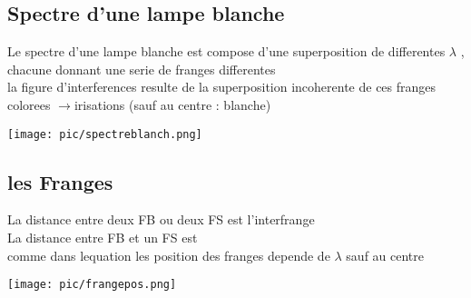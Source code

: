 \documentclass[12pt]{book}
\begin{document}
            \subsection{Spectre d'une lampe blanche}
                \begin{minipage}{0.49\linewidth}
                    Le spectre d'une lampe blanche est compose d'une superposition de differentes $\lambda$ , chacune donnant une serie de franges differentes \\
                    la figure d'interferences resulte de la superposition incoherente de ces franges colorees $\to $irisations (sauf au centre : blanche)
                \end{minipage}
                \begin{minipage}{0.49\linewidth}
                    \texttt{[image: pic/spectreblanch.png]}
                \end{minipage}
            \subsection{les Franges}
                \begin{minipage}{0.8\linewidth}
                    La distance entre deux FB ou deux FS est l'interfrange  \\
                    La distance entre FB et un FS est  \\
                    comme dans lequation les position des franges depende de $\lambda $ sauf au centre 
                \end{minipage}
                \begin{minipage}{0.2\linewidth}
                    \texttt{[image: pic/frangepos.png]}
                \end{minipage}
\end{document}
